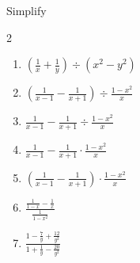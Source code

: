 \documentclass[12pt]{article}
\newenvironment{problem}[2][Problem]{\begin{trivlist}
\item[\hskip \labelsep {\bfseries #1}\hskip \labelsep {\bfseries #2.}]}{\end{trivlist}}
\begin{document}
\begin{problem}{5} Simplify
 \begin{multicols}{2}
   \begin{enumerate}[label=\roman*)]
   \item $\left(\frac{1}{x}+\frac{1}{y}\right)\div(x^2-y^2)$
   \item $\left(\frac{1}{x-1}-\frac{1}{x+1}\right)\div\frac{1-x^2}{x}$
   \item $\frac{1}{x-1}-\frac{1}{x+1}\div\frac{1-x^2}{x}$
   \item $\frac{1}{x-1}-\frac{1}{x+1}\cdot\frac{1-x^2}{x}$
   \item $\left(\frac{1}{x-1}-\frac{1}{x+1}\right)\cdot\frac{1-x^2}{x}$
   \item $\frac{\displaystyle\frac{1}{1-x}-\frac{1}{x}}{\displaystyle\frac{1}{1-x^2}}$
     \item $\frac{\displaystyle 1 -\frac{7}{y}+\frac{12}{y^2}}{\displaystyle 1+\frac{1}{y}-\frac{20}{y^2}}$
  \end{enumerate}
 \end{multicols}
\end{problem}


\end{document}
